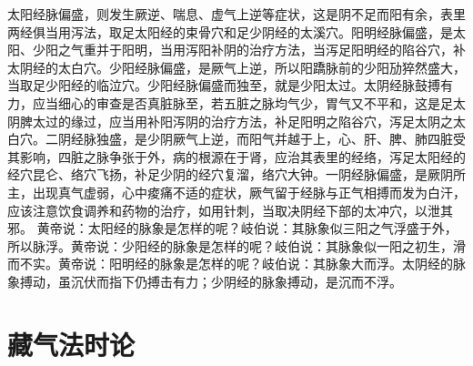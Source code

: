 \documentclass[a4paper,12pt,UTF8,twoside]{ctexbook}
\begin{document}
太阳经脉偏盛，则发生厥逆、喘息、虚气上逆等症状，这是阴不足而阳有余，表里两经俱当用泻法，取足太阳经的束骨穴和足少阴经的太溪穴。阳明经脉偏盛，是太阳、少阳之气重并于阳明，当用泻阳补阴的治疗方法，当泻足阳明经的陷谷穴，补太阴经的太白穴。少阳经脉偏盛，是厥气上逆，所以阳蹻脉前的少阳劢猝然盛大，当取足少阳经的临泣穴。少阳经脉偏盛而独至，就是少阳太过。太阴经脉鼓搏有力，应当细心的审查是否真脏脉至，若五脏之脉均气少，胃气又不平和，这是足太阴脾太过的缘过，应当用补阳泻阴的治疗方法，补足阳明之陷谷穴，泻足太阴之太白穴。二阴经脉独盛，是少阴厥气上逆，而阳气并越于上，心、肝、脾、肺四脏受其影响，四脏之脉争张于外，病的根源在于肾，应治其表里的经络，泻足太阳经的经穴昆仑、络穴飞扬，补足少阴的经穴复溜，络穴大钟。一阴经脉偏盛，是厥阴所主，出现真气虚弱，心中痠痛不适的症状，厥气留于经脉与正气相搏而发为白汗，应该注意饮食调养和药物的治疗，如用针刺，当取决阴经下部的太冲穴，以泄其邪。
黄帝说：太阳经的脉象是怎样的呢？岐伯说：其脉象似三阳之气浮盛于外，所以脉浮。黄帝说：少阳经的脉象是怎样的呢？岐伯说：其脉象似一阳之初生，滑而不实。黄帝说：阳明经的脉象是怎样的呢？岐伯说：其脉象大而浮。太阴经的脉象搏动，虽沉伏而指下仍搏击有力；少阴经的脉象搏动，是沉而不浮。

\chapter{藏气法时论}
\end{document}
